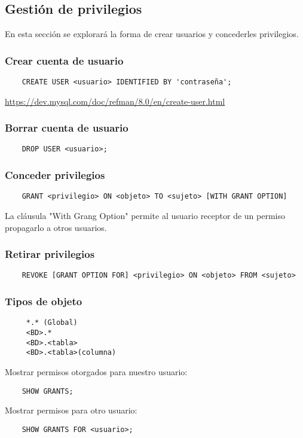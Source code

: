 \documentclass{article}
\begin{document}


\subsection{Gestión de privilegios}

En esta sección se explorará la forma de crear usuarios y concederles privilegios.
\subsubsection{Crear cuenta de usuario}
 \begin{verbatim}
 	CREATE USER <usuario> IDENTIFIED BY 'contraseña';
 \end{verbatim}
\url{https://dev.mysql.com/doc/refman/8.0/en/create-user.html}
\subsubsection{Borrar cuenta de usuario}
\begin{verbatim}
	DROP USER <usuario>;
\end{verbatim}
\subsubsection{Conceder privilegios}
\begin{verbatim}
	GRANT <privilegio> ON <objeto> TO <sujeto> [WITH GRANT OPTION]
\end{verbatim}
La cláusula "With Grang Option" permite al usuario receptor de un permiso propagarlo a otros usuarios.
\subsubsection{Retirar privilegios}
\begin{verbatim}
	REVOKE [GRANT OPTION FOR] <privilegio> ON <objeto> FROM <sujeto>
\end{verbatim}
 
\subsubsection{Tipos de objeto}
\begin{verbatim}
	 *.* (Global)
	 <BD>.* 
	 <BD>.<tabla>
	 <BD>.<tabla>(columna)

\end{verbatim}
Mostrar permisos otorgados para nuestro usuario:
\begin{verbatim}
	SHOW GRANTS;
\end{verbatim}
Mostrar permisos para otro usuario:
\begin{verbatim}
	SHOW GRANTS FOR <usuario>;
\end{verbatim}
\end{document}
